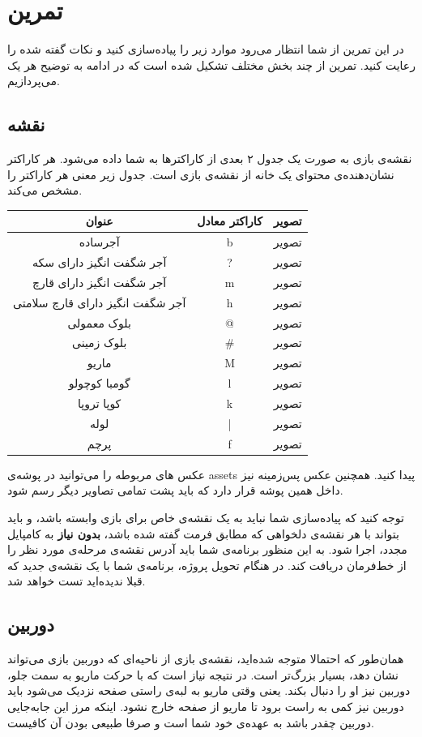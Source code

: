 \documentclass{utap}
\begin{document}
	\section{تمرین}
در این تمرین از شما انتظار می‌رود موارد زیر را پیاده‌سازی کنید و نکات گفته شده را رعایت کنید. تمرین از چند بخش مختلف تشکیل شده است که در ادامه به توضیح هر یک می‌پردازیم.

	\subsection{نقشه}
نقشه‌ی بازی به صورت یک جدول ۲ بعدی از کاراکترها به شما داده می‌شود. هر کاراکتر نشان‌دهنده‌ی محتوای یک خانه  از نقشه‌ی بازی است. جدول زیر معنی هر کاراکتر را مشخص می‌کند.
	\begin{table}[H]
		\centering
		\begin{tabular}{ccc}
			\hline
			عنوان & کاراکتر معادل & تصویر\\
			\hline
			آجر‌ساده & b & تصویر\\
			\hline
			آجر شگفت انگیز دارای سکه & ? & تصویر\\
			\hline
			آجر شگفت انگیز دارای قارچ & m & تصویر\\
			\hline
			آجر شگفت انگیز دارای قارچ سلامتی & h & تصویر\\
			\hline
			بلوک معمولی & @ & تصویر\\
			\hline
			بلوک زمینی & \# & تصویر\\
			\hline
			ماریو & M & تصویر\\
			\hline
			گومبا کوچولو & l & تصویر\\
			\hline
			کوپا تروپا & k & تصویر\\
			\hline
			لوله  & | & تصویر\\
			\hline
			پرچم & f & تصویر\\
			\hline
		\end{tabular}
	\end{table}
عکس های مربوطه را می‌توانید در پوشه‌ی assets پیدا کنید. همچنین عکس پس‌زمینه‌ نیز داخل همین پوشه قرار دارد که باید پشت تمامی تصاویر دیگر رسم شود.

توجه کنید که پیاده‌سازی شما نباید به یک نقشه‌ی خاص برای بازی وابسته باشد، و باید بتواند با هر نقشه‌ی دلخواهی که مطابق فرمت گفته شده باشد، \textbf{بدون نیاز} به کامپایل مجدد، اجرا شود. به این  منظور برنامه‌ی شما باید آدرس نقشه‌ی مرحله‌ی مورد نظر را از خط‌فرمان دریافت کند. در هنگام تحویل پروژه، برنامه‌ی شما با یک نقشه‌ی جدید که قبلا ندیده‌اید تست خواهد شد.

	\subsection{دوربین}
همان‌طور که  احتمالا متوجه شده‌اید، نقشه‌ی بازی از ناحیه‌ای که دوربین بازی می‌تواند نشان دهد، بسیار بزرگ‌تر است. در نتیجه نیاز است که با حرکت ماریو به سمت جلو، دوربین نیز او را دنبال بکند. یعنی وقتی ماریو به لبه‌ی راستی صفحه نزدیک می‌شود باید دوربین نیز کمی به راست برود تا ماریو از صفحه خارج نشود. اینکه مرز این جابه‌جایی دوربین چقدر باشد به عهده‌ی خود شما است و صرفا طبیعی بودن آن کافیست.
\end{document}
